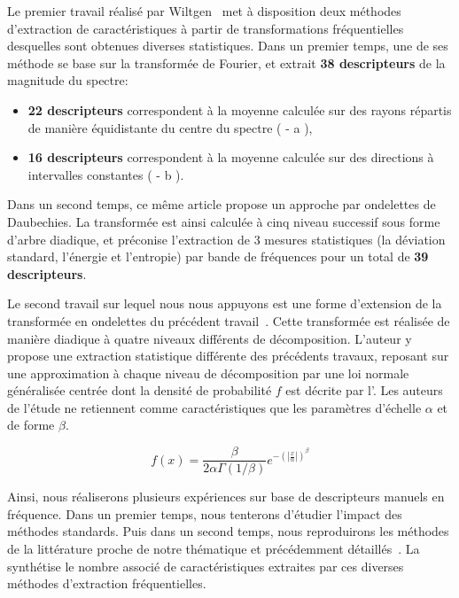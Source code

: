 Le premier travail réalisé par Wiltgen~\cite{Wiltgen2008} met à disposition deux méthodes d'extraction de caractéristiques à partir de transformations fréquentielles desquelles sont obtenues diverses statistiques. Dans un premier temps, une de ses méthode se base sur la transformée de Fourier, et extrait \textbf{38 descripteurs} de la magnitude du spectre:
\begin{itemize}
    \item \textbf{22 descripteurs} correspondent à la moyenne calculée sur des rayons répartis de manière équidistante du centre du spectre (\label{fig:scheme_fourier_features} - a ),
    \item \textbf{16 descripteurs} correspondent à la moyenne calculée sur des directions à intervalles constantes (\label{fig:scheme_fourier_features} - b ).
\end{itemize} Dans un second temps, ce même article propose un approche par ondelettes de Daubechies. La transformée est ainsi calculée à cinq niveau successif sous forme d'arbre diadique, et préconise l'extraction de 3 mesures statistiques (la déviation standard, l'énergie et l'entropie) par bande de fréquences pour un total de \textbf{39 descripteurs}.\par

Le second travail sur lequel nous nous appuyons est une forme d'extension de la transformée en ondelettes du précédent travail~\cite{Halimi2017a}. Cette transformée est réalisée de manière diadique à quatre niveaux différents de décomposition. L'auteur y propose une extraction statistique différente des précédents travaux, reposant sur une approximation à chaque niveau de décomposition par une loi normale généralisée centrée dont la densité de probabilité $f$ est décrite par l'. Les auteurs de l'étude ne retiennent comme caractéristiques que les paramètres d'échelle $\alpha$ et de forme $\beta$.\par
\begin{equation}
    f(x)= \frac{\beta}{2\alpha\Gamma(1/\beta)} e^{-\left(|\frac{x}{\alpha}|\right)^\beta}
    \label{eq:ggd}
\end{equation}
 
Ainsi, nous réaliserons plusieurs expériences sur base de descripteurs manuels en fréquence. Dans un premier temps, nous tenterons d'étudier l'impact des méthodes standards. Puis dans un second temps, nous reproduirons les méthodes de la littérature proche de notre thématique et précédemment détaillés~\cite{Wiltgen2008, Halimi2017a}. La  synthétise le nombre associé de caractéristiques extraites par ces diverses méthodes d'extraction fréquentielles.\par

